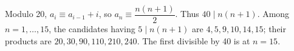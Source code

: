 Modulo 20, $a_i\equiv a_{i-1}+i$, so $a_n \equiv \dfrac{n (n+1)}{2}$. Thus $40\mid n(n+1)$. Among $n=1,\ldots,15$, the candidates having $5\mid n(n+1)$ are $4,5,9,10,14,15$; their products are $20,30,90,110,210,240$. The first divisible by 40 is at $\boxed{n=15}$.
